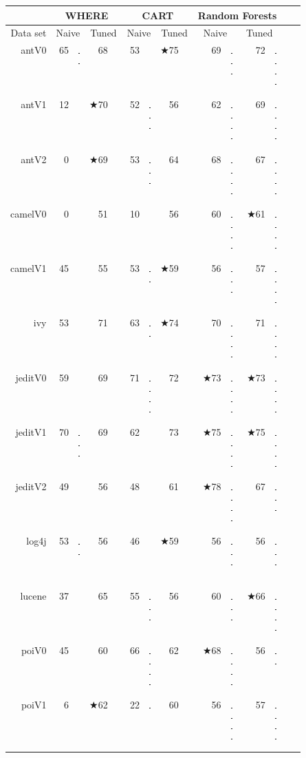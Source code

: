 \documentclass{acm_proc_article-sp}
\newcommand{\crule}[3][darkgray]{\textcolor{#1}{\rule{#2}{#3}}}
\newcommand{\rone}{\crule{1mm}{1.95mm}}
\newcommand{\rtwo}{\crule{1mm}{1.95mm}\hspace{0.3pt}\crule{1mm}{1.95mm}}
\newcommand{\rthree}{\crule{1mm}{1.95mm}\hspace{0.3pt}\crule{1mm}{1.95mm}\hspace{0.3pt}\crule{1mm}{1.95mm}}
\newcommand{\rfour}{\crule{1mm}{1.95mm}\hspace{0.3pt}\crule{1mm}{1.95mm}\hspace{0.3pt}\crule{1mm}{1.95mm}\hspace{0.3pt}\crule{1mm}{1.95mm}}
\begin{document}
\begin{figure}
\renewcommand{\baselinestretch}{0.8} 

\scriptsize  
\begin{tabular}{r|r@{~}l@{~}|r@{~}l|r@{~}l|r@{~}l|r@{~}l@{~}|r@{~}l@{~}r@{~}l}
      &   \multicolumn{4}{c|}{WHERE}         &   \multicolumn{4}{c|}{CART}         &   \multicolumn{4}{c}{Random Forests}         \\\hline
  Data set   &   \multicolumn{2}{c}{Naive}         &   \multicolumn{2}{c|}{Tuned}         &   \multicolumn{2}{c}{Naive}         &   \multicolumn{2}{c|}{Tuned}    &   \multicolumn{2}{c}{Naive}  &   \multicolumn{2}{c}{Tuned}\\\hline
antV0 & 65 & {\rtwo} & 68 & {\rthree} & 53 &         & $\bigstar$75 & {\rfour} & 69 & {\rthree} & 72 & {\rfour}\\
antV1 & 12 &         & $\bigstar$70 & {\rfour} & 52 & {\rthree} & 56 & {\rthree} & 62 & {\rfour} & 69 & {\rfour}\\
antV2 & 0 &         & $\bigstar$69 & {\rfour} & 53 & {\rthree} & 64 & {\rfour} & 68 & {\rfour} & 67 & {\rfour}\\
camelV0 & 0 &         & 51 & {\rfour} & 10 &         & 56 & {\rfour} & 60 & {\rfour} & $\bigstar$61 & {\rfour}\\
camelV1 & 45 &         & 55 & {\rthree} & 53 & {\rtwo} & $\bigstar$59 & {\rfour} & 56 & {\rthree} & 57 & {\rfour}\\
ivy & 53 &         & 71 & {\rfour} & 63 & {\rtwo} & $\bigstar$74 & {\rfour} & 70 & {\rfour} & 71 & {\rfour}\\
jeditV0 & 59 &         & 69 & {\rthree} & 71 & {\rfour} & 72 & {\rfour} & $\bigstar$73 & {\rfour} & $\bigstar$73 & {\rfour}\\
jeditV1 & 70 & {\rthree} & 69 & {\rtwo} & 62 &         & 73 & {\rfour} & $\bigstar$75 & {\rfour} & $\bigstar$75 & {\rfour}\\
jeditV2 & 49 &         & 56 & {\rone} & 48 &         & 61 & {\rtwo} & $\bigstar$78 & {\rfour} & 67 & {\rthree}\\
log4j & 53 & {\rtwo} & 56 & {\rthree} & 46 &         & $\bigstar$59 & {\rfour} & 56 & {\rthree} & 56 & {\rthree}\\
lucene & 37 &         & 65 & {\rfour} & 55 & {\rthree} & 56 & {\rthree} & 60 & {\rthree} & $\bigstar$66 & {\rfour}\\
poiV0 & 45 &         & 60 & {\rthree} & 66 & {\rfour} & 62 & {\rthree} & $\bigstar$68 & {\rfour} & 56 & {\rtwo}\\
poiV1 & 6 &         & $\bigstar$62 & {\rfour} & 22 & {\rone} & 60 & {\rfour} & 56 & {\rfour} & 57 & {\rfour}\\

\end{tabular}
\end{figure}
\end{document}

